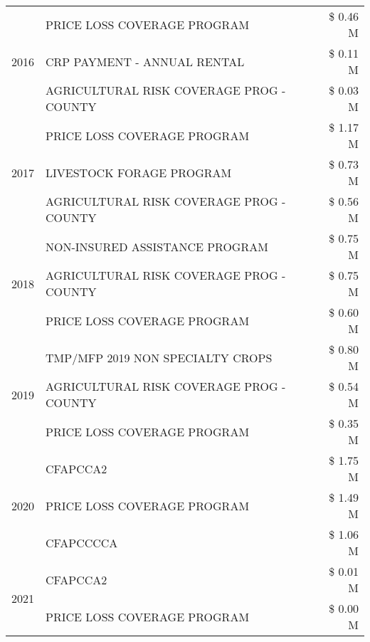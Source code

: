 \begin{tabular}{llr}
\cline{1-3}
\multirow[t]{3}{*}{2016} & PRICE LOSS COVERAGE PROGRAM & \$ 0.46 M \\
 & CRP PAYMENT - ANNUAL RENTAL & \$ 0.11 M \\
 & AGRICULTURAL RISK COVERAGE PROG - COUNTY & \$ 0.03 M \\
\cline{1-3}
\multirow[t]{3}{*}{2017} & PRICE LOSS COVERAGE PROGRAM & \$ 1.17 M \\
 & LIVESTOCK FORAGE PROGRAM & \$ 0.73 M \\
 & AGRICULTURAL RISK COVERAGE PROG - COUNTY & \$ 0.56 M \\
\cline{1-3}
\multirow[t]{3}{*}{2018} & NON-INSURED ASSISTANCE PROGRAM & \$ 0.75 M \\
 & AGRICULTURAL RISK COVERAGE PROG - COUNTY & \$ 0.75 M \\
 & PRICE LOSS COVERAGE PROGRAM & \$ 0.60 M \\
\cline{1-3}
\multirow[t]{3}{*}{2019} & TMP/MFP 2019 NON SPECIALTY CROPS & \$ 0.80 M \\
 & AGRICULTURAL RISK COVERAGE PROG - COUNTY & \$ 0.54 M \\
 & PRICE LOSS COVERAGE PROGRAM & \$ 0.35 M \\
\cline{1-3}
\multirow[t]{3}{*}{2020} & CFAPCCA2 & \$ 1.75 M \\
 & PRICE LOSS COVERAGE PROGRAM & \$ 1.49 M \\
 & CFAPCCCCA & \$ 1.06 M \\
\cline{1-3}
\multirow[t]{2}{*}{2021} & CFAPCCA2 & \$ 0.01 M \\
 & PRICE LOSS COVERAGE PROGRAM & \$ 0.00 M \\
\cline{1-3}
\bottomrule
\end{tabular}
